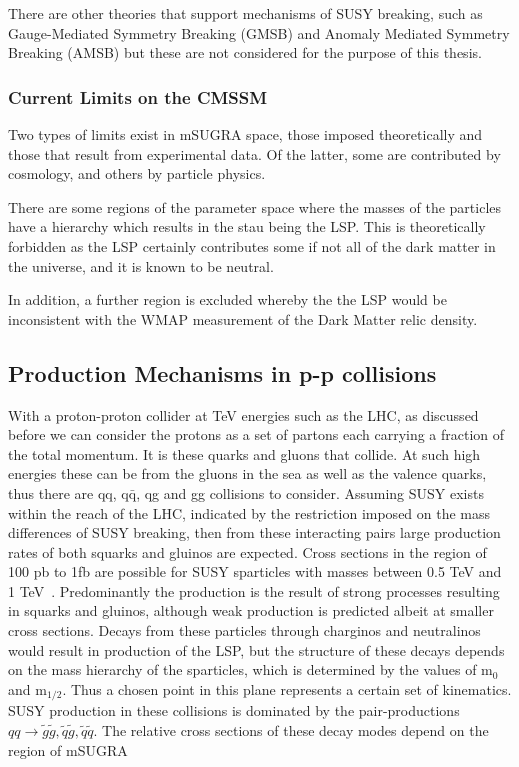 There are other theories that support mechanisms of SUSY breaking, such as Gauge-Mediated Symmetry Breaking (GMSB) and Anomaly Mediated Symmetry Breaking (AMSB) but these are not considered for the purpose of this thesis. 

\subsubsection{Current Limits on the CMSSM}

Two types of limits exist in mSUGRA space, those imposed theoretically and those that result from experimental data. Of the latter, some are contributed by cosmology, and others by particle physics. 

There are some regions of the parameter space where the masses of the particles have a hierarchy which results in the stau being the LSP. This is theoretically forbidden as the LSP certainly contributes some if not all of the dark matter in the universe, and it is known to be neutral. 

In addition, a further region is excluded whereby the the LSP would be inconsistent with the WMAP measurement of the Dark Matter relic density. 

\subsection{Production Mechanisms in p-p collisions}
With a proton-proton collider at TeV energies such as the LHC, as discussed before we can consider the protons as a set of partons each carrying a fraction of the total momentum. It is these quarks and gluons that collide. At such high energies these can be from the gluons in the sea as well as the valence quarks, thus there are qq, $\textrm{q}\bar{\textrm{q}}$, qg and gg collisions to consider.
Assuming SUSY exists within the reach of the LHC, indicated by the restriction imposed on the mass differences of SUSY breaking, then from these interacting pairs large production rates of both squarks and gluinos are expected. Cross sections in the region of 100 pb to 1fb are possible for SUSY sparticles with masses between 0.5 TeV and 1 TeV~\cite{early}. Predominantly the production is the result of strong processes resulting in squarks and gluinos, although weak production is predicted albeit at smaller cross sections. Decays from these particles through charginos and neutralinos would result in production of the LSP, but the structure of these decays depends on the mass hierarchy of the sparticles, which is determined by the values of m$_{0}$ and m$_{1/2}$.  Thus a chosen point in this plane represents a certain set of kinematics. SUSY production in these collisions is dominated by the pair-productions $ qq \rightarrow \tilde{g} \tilde{g}, \tilde{q}\tilde{g}, \tilde{q} \tilde{q}$. The relative cross sections of these decay modes depend on the region of mSUGRA 

